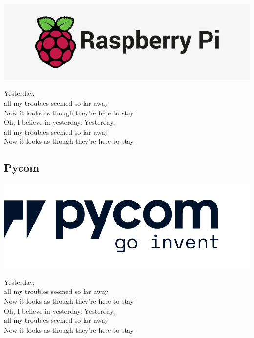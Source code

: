 		\noindent
		\begin{minipage}{0.5\textwidth}%
			\includegraphics[width=\textwidth]{resources/img/51-513503_pi-raspberry-pi-logo}
		\end{minipage}%
		\hfill%
		\begin{minipage}{0.55\textwidth}\raggedright
			Yesterday,\\
			all my troubles seemed so far away\\
			Now it looks as though they're here to stay\\
			Oh, I believe in yesterday.				Yesterday,\\
			all my troubles seemed so far away\\
			Now it looks as though they're here to stay\\
		\end{minipage}	
		
		\subsection{Pycom}
	
		\noindent
		\begin{minipage}{0.5\textwidth}%
			\includegraphics[width=\textwidth]{resources/img/pycom-logo-new-rp1}
		\end{minipage}%
		\hfill%
		\begin{minipage}{0.55\textwidth}\raggedright
			Yesterday,\\
			all my troubles seemed so far away\\
			Now it looks as though they're here to stay\\
			Oh, I believe in yesterday.				Yesterday,\\
			all my troubles seemed so far away\\
			Now it looks as though they're here to stay\\
		\end{minipage}
		
